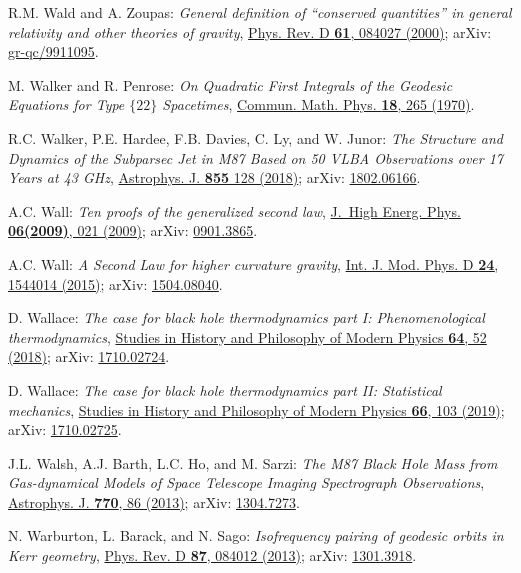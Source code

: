 \begin{thebibliography}{123}
R.M. Wald and A. Zoupas:
{\em General definition of ``conserved quantities'' in general relativity and other theories of gravity},
\href{https://doi.org/10.1103/PhysRevD.61.084027}{Phys. Rev. D {\bf 61}, 084027 (2000)};
arXiv: \href{https://arxiv.org/abs/gr-qc/9911095}{gr-qc/9911095}.

M. Walker and R. Penrose: {\em On Quadratic First Integrals of the Geodesic Equations
for Type $\{22\}$ Spacetimes},
\href{https://doi.org/10.1007/BF01649445}{Commun. Math. Phys. {\bf 18}, 265 (1970)}.

R.C. Walker, P.E. Hardee, F.B. Davies, C. Ly, and W. Junor:
{\em The Structure and Dynamics of the Subparsec Jet in M87 Based on 50 VLBA Observations over 17 Years at 43 GHz},
\href{https://doi.org/10.3847/1538-4357/aaafcc}{Astrophys. J. {\bf 855} 128 (2018)};
arXiv: \href{https://arxiv.org/abs/1802.06166}{1802.06166}.

A.C. Wall:
{\em Ten proofs of the generalized second law},
\href{https://doi.org/10.1088/1126-6708/2009/06/021}{J.~High Energ. Phys. {\bf 06(2009)}, 021 (2009)};
arXiv: \href{https://arxiv.org/abs/0901.3865}{0901.3865}.

A.C. Wall:
{\em A Second Law for higher curvature gravity},
\href{https://doi.org/10.1142/S0218271815440149}{Int. J. Mod. Phys. D {\bf 24}, 1544014 (2015)};
arXiv: \href{https://arxiv.org/abs/1504.08040}{1504.08040}.

D. Wallace:
{\em The case for black hole thermodynamics part I: Phenomenological thermodynamics},
\href{https://doi.org/10.1016/j.shpsb.2018.05.002}{Studies in History and Philosophy of Modern Physics {\bf 64}, 52 (2018)};
arXiv: \href{https://arxiv.org/abs/1710.02724}{1710.02724}.

D. Wallace:
{\em The case for black hole thermodynamics part II: Statistical mechanics},
\href{https://doi.org/10.1016/j.shpsb.2018.10.006}{Studies in History and Philosophy of Modern Physics {\bf 66}, 103 (2019)};
arXiv: \href{https://arxiv.org/abs/1710.02725}{1710.02725}.

J.L. Walsh, A.J. Barth, L.C. Ho, and M. Sarzi:
{\em The M87 Black Hole Mass from Gas-dynamical Models of Space Telescope Imaging Spectrograph Observations},
\href{https://doi.org/10.1088/0004-637X/770/2/86}{Astrophys. J. {\bf 770}, 86 (2013)};
arXiv: \href{https://arxiv.org/abs/1304.7273}{1304.7273}.

N. Warburton, L. Barack, and N. Sago:
{\em Isofrequency pairing of geodesic orbits in Kerr geometry},
\href{https://doi.org/10.1103/PhysRevD.87.084012}{Phys. Rev. D {\bf 87}, 084012 (2013)};
arXiv: \href{https://arxiv.org/abs/1301.3918}{1301.3918}.


\end{thebibliography}
